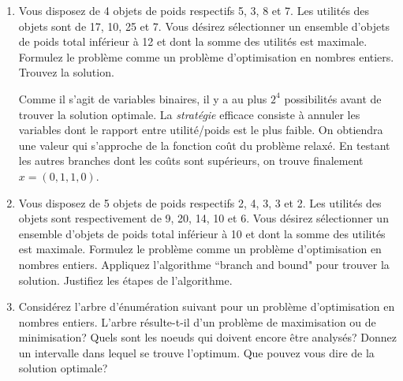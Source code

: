 \begin{enumerate}
    \begin{solution}
      \nosolution
    \end{solution}

  \item Vous disposez de 4 objets de poids respectifs 5, 3, 8 et 7. Les utilités des
    objets sont de 17, 10, 25 et 7. Vous désirez sélectionner un ensemble d'objets de poids total inférieur  à 12 et dont la somme
    des utilités est maximale.  Formulez le problème comme un problème d'optimisation en nombres entiers. Trouvez la solution.


    \begin{solution}
      Comme il s'agit de variables binaires, il y a au plus $2^{4}$ possibilités avant de trouver la solution optimale. La \textit{stratégie} efficace consiste à annuler les variables dont le rapport entre utilité/poids est le plus faible. On obtiendra une valeur qui s'approche de la fonction coût du problème relaxé. En testant les autres branches dont les coûts sont supérieurs, on trouve finalement $x = (0,1,1,0)$.
    \end{solution}

  \item Vous disposez de 5 objets de poids respectifs 2, 4, 3, 3 et 2. Les
    utilités des objets sont respectivement de 9, 20, 14, 10 et 6. Vous désirez
    sélectionner un ensemble d'objets de poids total inférieur  à 10
    et dont la somme des utilités est maximale.  Formulez le problème
    comme un problème d'optimisation en nombres entiers. Appliquez l'algorithme ``branch and bound" pour trouver la
    solution. Justifiez les étapes de l'algorithme.


    \begin{solution}
      \nosolution
    \end{solution}

  \item  Considérez l'arbre d'énumération suivant pour un problème d'optimisation en nombres entiers. L'arbre
    résulte-t-il d'un problème de maximisation ou de minimisation?  Quels sont les noeuds qui doivent encore être analysés? Donnez
    un intervalle dans lequel se trouve l'optimum. Que pouvez vous dire de la solution optimale?








    \begin{solution}
      \nosolution
    \end{solution}


\end{enumerate}
